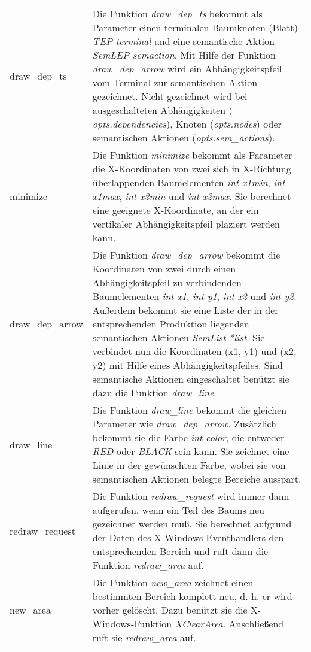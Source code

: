 \begin{tabular}{|l|p{9.0cm}|}
\hline
draw\_dep\_ts & Die Funktion {\it draw\_dep\_ts} bekommt als Parameter einen terminalen Baumknoten (Blatt) {\it
TEP terminal} und eine semantische Aktion {\it SemLEP semaction}. Mit Hilfe der Funktion {\it draw\_dep\_arrow} wird ein
Abh\"angigkeitspfeil vom Terminal zur semantischen Aktion gezeichnet. Nicht gezeichnet wird bei ausgeschalteten Abh\"angigkeiten ({\it
opts.dependencies}), Knoten ({\it opts.nodes}) oder semantischen Aktionen ({\it opts.sem\_actions}).\\
minimize & Die Funktion {\it minimize} bekommt
als Parameter die X-Koordinaten von zwei sich in X-Richtung \"uberlappenden Baumelementen {\it int x1min}, {\it int x1max}, {\it int x2min} und {\it int
x2max}. Sie berechnet eine geeignete X-Koordinate, an der ein vertikaler Abh\"angigkeitspfeil plaziert werden kann.\\ draw\_dep\_arrow & Die Funktion
{\it draw\_dep\_arrow} bekommt die Koordinaten von zwei durch einen Abh\"angigkeitspfeil zu verbindenden Baumelementen {\it int x1}, {\it int y1}, {\it
int x2} und {\it int y2}. Au\ss{}erdem bekommt sie eine Liste der in der entsprechenden Produktion liegenden semantischen Aktionen {\it SemList *list}.
Sie verbindet nun die Koordinaten (x1, y1) und (x2, y2) mit Hilfe eines Abh\"angigkeitspfeiles. Sind semantische Aktionen eingeschaltet ben\"utzt sie dazu
die Funktion {\it draw\_line}. \\
draw\_line & Die Funktion {\it draw\_line} bekommt die gleichen Parameter wie {\it
draw\_dep\_arrow}. Zus\"atzlich bekommt sie die Farbe {\it int color}, die entweder {\it RED} oder {\it BLACK} sein kann. Sie
zeichnet eine Linie in der gew\"unschten Farbe, wobei sie von semantischen Aktionen belegte Bereiche ausspart. \\
redraw\_request & Die Funktion {\it
redraw\_request} wird immer dann aufgerufen, wenn ein Teil des Baums neu gezeichnet werden mu\ss{}. Sie berechnet aufgrund der Daten des
X-Windows-Eventhandlers den entsprechenden Bereich und ruft dann die Funktion {\it redraw\_area} auf. \\ new\_area & Die Funktion
{\it new\_area} zeichnet einen bestimmten Bereich komplett neu, d. h. er wird vorher gel\"oscht. Dazu ben\"utzt sie die X-Windows-Funktion {\it
XClearArea}. Anschlie\ss{}end ruft sie {\it redraw\_area} auf. \\
\hline
\end{tabular}

